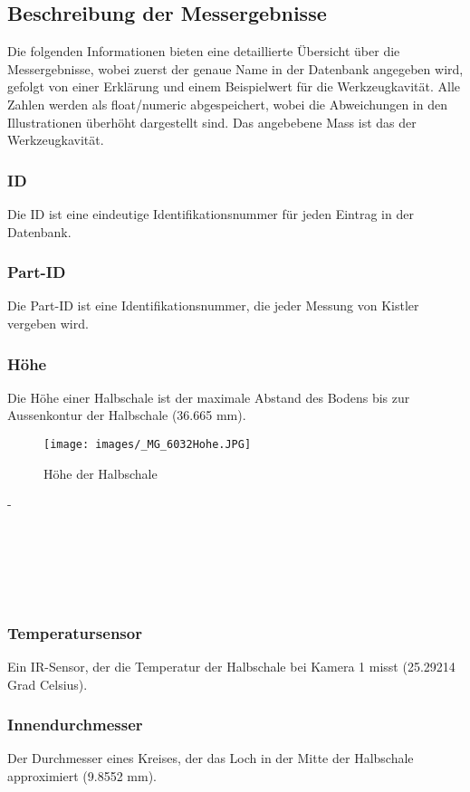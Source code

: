 \subsection{Beschreibung der Messergebnisse}
\label{AbKist}

Die folgenden Informationen bieten eine detaillierte Übersicht über die Messergebnisse, wobei zuerst der genaue Name in der Datenbank angegeben wird, gefolgt von einer Erklärung und einem Beispielwert für die Werkzeugkavität. Alle Zahlen werden als float/numeric abgespeichert, wobei die Abweichungen in den Illustrationen überhöht dargestellt sind. Das angebebene Mass ist das der Werkzeugkavität.

\subsubsection*{ID}
Die ID ist eine eindeutige Identifikationsnummer für jeden Eintrag in der Datenbank.

\subsubsection*{Part-ID}
Die Part-ID ist eine Identifikationsnummer, die jeder Messung von Kistler vergeben wird.

\subsubsection*{Höhe}
Die Höhe einer Halbschale ist der maximale Abstand des Bodens bis zur Aussenkontur der Halbschale (36.665 mm).

\begin{wrapfigure}{r}{0.3\textwidth}
\centering
\texttt{[image: images/\_MG\_6032Hohe.JPG]}
\caption{Höhe der Halbschale}
\label{fig:DefH}
\end{wrapfigure}
-\\
\\
\\
\\
\\
\\
\subsubsection*{Temperatursensor}
Ein IR-Sensor, der die Temperatur der Halbschale bei Kamera 1 misst (25.29214 Grad Celsius).


\subsubsection*{Innendurchmesser}
Der Durchmesser eines Kreises, der das Loch in der Mitte der Halbschale approximiert (9.8552 mm).

